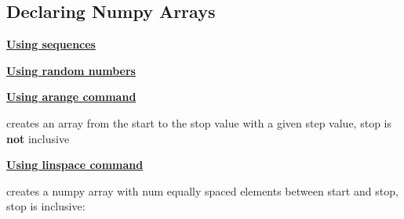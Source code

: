 \subsection{Declaring Numpy Arrays}
{\centering\underline{\textbf{Using sequences}} \par}


{\centering\underline{\textbf{Using random numbers}} \par}


{\centering\underline{\textbf{Using arange command}} \par}
creates an array from the start to the stop value with a given step value, stop is \textbf{not} inclusive


{\centering\underline{\textbf{Using linspace command}} \par}
creates a numpy array with num equally spaced elements between start and stop, stop is inclusive:
